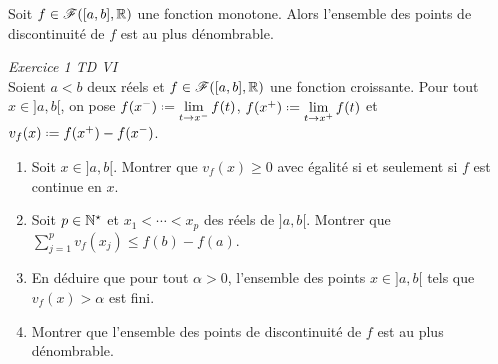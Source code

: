 \begin{prop}
    Soit $f \in \mathscr{F}([a, b], \mathbb{R})$ une fonction monotone. Alors l'ensemble des points de discontinuité de $f$ est au plus dénombrable. 
\end{prop}

\begin{exercice}
    \emph{Exercice 1 TD VI} \\
    Soient $a < b$ deux réels et $f \in \mathscr{F}([a, b], \mathbb{R})$ une fonction croissante. Pour tout $x \in ]a, b[$, on pose $f(x^-) \defeq \lim\limits_{t \to x^-} f(t)$, $f(x^+) \defeq \lim\limits_{t \to x^+} f(t)$ et $v_f(x) \defeq f(x^+)-f(x^-)$.
    \begin{enumerate}
        \item Soit $x \in ]a, b[$. Montrer que $v_f(x) \geqslant 0$ avec égalité si et seulement si $f$ est continue en $x$.
        \item Soit $p \in \mathbb{N}^\star$ et $x_1 < \cdots < x_p$ des réels de $]a, b[$. Montrer que $\sum\limits_{j=1}^p v_f(x_j) \leqslant f(b)-f(a)$.
        \item En déduire que pour tout $\alpha > 0$, l'ensemble des points $x \in ]a, b[$ tels que $v_f(x) > \alpha$ est fini. 
        \item Montrer que l'ensemble des points de discontinuité de $f$ est au plus dénombrable. 
    \end{enumerate}
\end{exercice}


